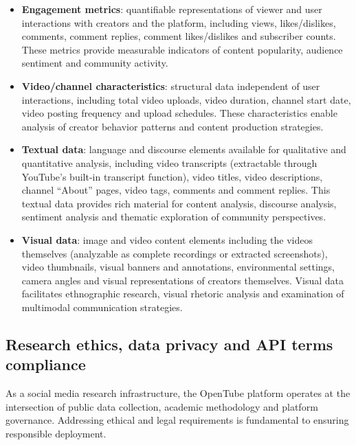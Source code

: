 \begin{itemize}
    \item \textbf{Engagement metrics}: quantifiable representations of viewer and user interactions with creators and the platform, including views, likes/dislikes, comments, comment replies, comment likes/dislikes and subscriber counts. These metrics provide measurable indicators of content popularity, audience sentiment and community activity.

    \item \textbf{Video/channel characteristics}: structural data independent of user interactions, including total video uploads, video duration, channel start date, video posting frequency and upload schedules. These characteristics enable analysis of creator behavior patterns and content production strategies.

    \item \textbf{Textual data}: language and discourse elements available for qualitative and quantitative analysis, including video transcripts (extractable through YouTube's built-in transcript function), video titles, video descriptions, channel \enquote{About} pages, video tags, comments and comment replies. This textual data provides rich material for content analysis, discourse analysis, sentiment analysis and thematic exploration of community perspectives.

    \item \textbf{Visual data}: image and video content elements including the videos themselves (analyzable as complete recordings or extracted screenshots), video thumbnails, visual banners and annotations, environmental settings, camera angles and visual representations of creators themselves. Visual data facilitates ethnographic research, visual rhetoric analysis and examination of multimodal communication strategies.
\end{itemize}

\subsection{Research ethics, data privacy and API terms compliance}

\label{subsec:ethics_privacy_and_terms_compliance}

As a social media research infrastructure, the OpenTube platform operates at the intersection of public data collection, academic methodology and platform governance. Addressing ethical and legal requirements is fundamental to ensuring responsible deployment.

